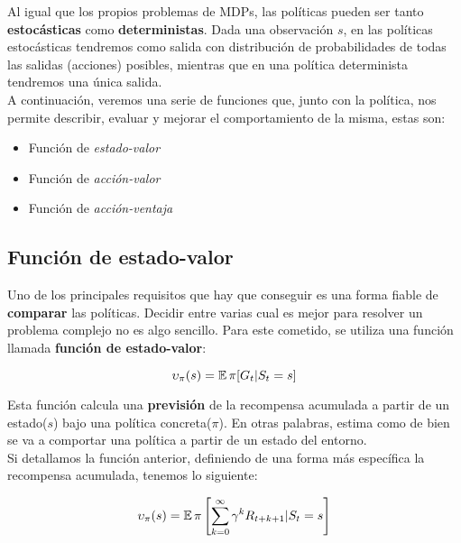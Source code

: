 \documentclass[11pt,fleqn]{book} %
\begin{document}
Al igual que los propios problemas de MDPs, las políticas pueden ser tanto \textbf{estocásticas} como \textbf{deterministas}. Dada una observación $s$, en las políticas estocásticas tendremos como salida con distribución de probabilidades de todas las salidas (acciones) posibles, mientras que en una política determinista tendremos una única salida. \\

A continuación, veremos una serie de funciones que, junto con la política, nos permite describir, evaluar y mejorar el comportamiento de la misma, estas son:\\

\begin{itemize}
	\item Función de \textit{estado-valor}\\
	
	\item Función de \textit{acción-valor}\\
	
	\item Función de \textit{acción-ventaja}\\
\end{itemize}

\subsection{Función de estado-valor}

Uno de los principales requisitos que hay que conseguir es una forma fiable de \textbf{comparar} las políticas. Decidir entre varias cual es mejor para resolver un problema complejo no es algo sencillo. Para este cometido, se utiliza una función llamada \textbf{función de estado-valor}: 

\begin{equation}
\upsilon_\pi(s)=\operatorname*{\mathbb{E}}\pi[G_t|S_t=s]
\end{equation}

Esta función calcula una \textbf{previsión} de la recompensa acumulada a partir de un estado($s$) bajo una política concreta($\pi$). En otras palabras, estima como de bien se va a comportar una política a partir de un estado del entorno.\\

Si detallamos la función anterior, definiendo de una forma más específica la recompensa acumulada, tenemos lo siguiente:

\begin{equation}
\upsilon_\pi(s)=\operatorname*{\mathbb{E}}\pi\left[\sum^\infty_{k=0}\gamma^kR_{t+k+1} | S_t=s\right]
\end{equation}
\end{document}
